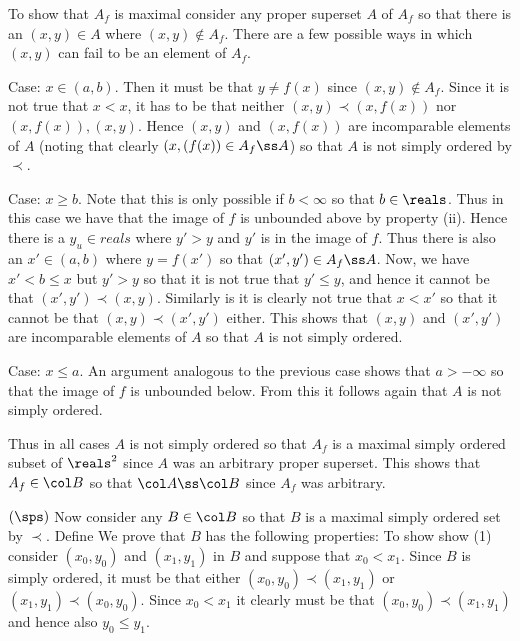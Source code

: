 {{    To show that $A_f$ is maximal consider any proper superset $A$ of $A_f$ so that there is an $(x,y) \in A$ where $(x,y) \notin A_f$.
    There are a few possible ways in which $(x,y)$ can fail to be an element of $A_f$.

    Case: $x \in (a,b)$.
    Then it must be that $y \neq f(x)$ since $(x,y) \notin A_f$.
    Since it is not true that $x < x$, it has to be that neither $(x,y) \prec (x,f(x))$ nor $(x,f(x)), (x,y)$.
    Hence $(x,y)$ and $(x,f(x))$ are incomparable elements of $A$ (noting that clearly $(x,(f(x)) \in A_f \ss A$) so that $A$ is not simply ordered by $\prec$.

    Case: $x \geq b$.
    Note that this is only possible if $b < \infty$ so that $b \in \reals$.
    Thus in this case we have that the image of $f$ is unbounded above by property (ii).
    Hence there is a $y_u \in reals$ where $y' > y$ and $y'$ is in the image of $f$.
    Thus there is also an $x' \in (a,b)$ where $y = f(x')$ so that $(x',y') \in A_f \ss A$.
    Now, we have $x' < b \leq x$ but $y' > y$ so that it is not true that $y' \leq y$, and hence it cannot be that $(x',y') \prec (x,y)$.
    Similarly is it is clearly not true that $x < x'$ so that it cannot be that $(x,y) \prec (x',y')$ either.
    This shows that $(x,y)$ and $(x',y')$ are incomparable elements of $A$ so that $A$ is not simply ordered.

    Case: $x \leq a$.
    An argument analogous to the previous case shows that $a > -\infty$ so that the image of $f$ is unbounded below.
    From this it follows again that $A$ is not simply ordered.

    Thus in all cases $A$ is not simply ordered so that $A_f$ is a maximal simply ordered subset of $\reals^2$ since $A$ was an arbitrary proper superset.
    This shows that $A_f \in \cB$ so that $\cA \ss \cB$ since $A_f$ was arbitrary.

    $(\sps)$ Now consider any $B \in \cB$ so that $B$ is a maximal simply ordered set by $\prec$.
    Define
    We prove that $B$ has the following properties:
    To show show (1) consider $(x_0,y_0)$ and $(x_1,y_1)$ in $B$ and suppose that $x_0 < x_1$.
    Since $B$ is simply ordered, it must be that either $(x_0,y_0) \prec (x_1,y_1)$ or $(x_1,y_1) \prec (x_0,y_0)$.
    Since $x_0 < x_1$ it clearly must be that $(x_0,y_0) \prec (x_1,y_1)$ and hence also $y_0 \leq y_1$.

}}
